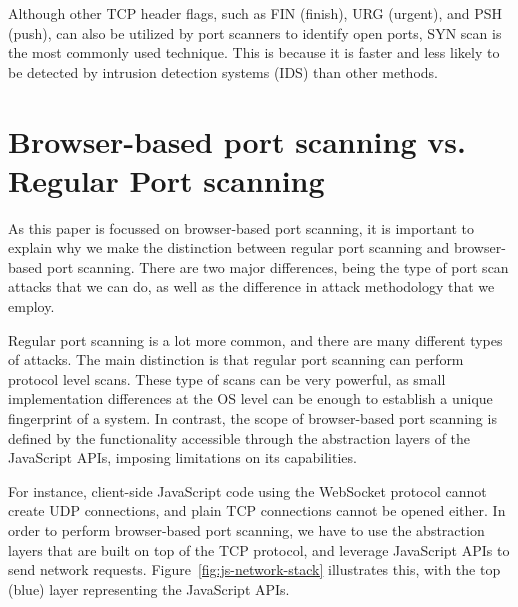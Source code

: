 Although other TCP header flags, such as FIN (finish), URG (urgent), and PSH (push), can also be utilized by port scanners to identify open ports, SYN scan is the most commonly used technique. This is because it is faster and less likely to be detected by intrusion detection systems (IDS) than other methods. 

\section{Browser-based port scanning vs. Regular Port scanning}

As this paper is focussed on browser-based port scanning, it is important to explain why we make the distinction between regular port scanning and browser-based port scanning. 
There are two major differences, being the type of port scan attacks that we can do, as well as the difference in attack methodology that we employ. 

Regular port scanning is a lot more common, and there are many different types of attacks. The main distinction is that regular port scanning can perform protocol level scans. These type of scans can be very powerful, as small implementation differences at the OS level can be enough to establish a unique fingerprint of a system. In contrast, the scope of browser-based port scanning is defined by the functionality accessible through the abstraction layers of the JavaScript APIs, imposing limitations on its capabilities.

For instance, client-side JavaScript code using the WebSocket protocol cannot create UDP connections, and plain TCP connections cannot be opened either. In order to perform browser-based port scanning, we have to use the abstraction layers that are built on top of the TCP protocol, and leverage JavaScript APIs to send network requests. Figure~\ref{fig:js-network-stack} illustrates this, with the top (blue) layer representing the JavaScript APIs.

